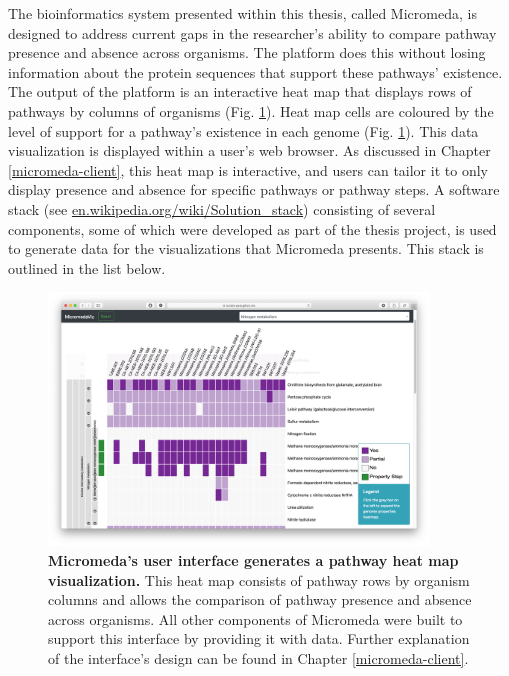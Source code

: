 The bioinformatics system presented within this thesis, called Micromeda, is designed to address current gaps in the researcher's ability to compare pathway presence and absence across organisms. The platform does this without losing information about the protein sequences that support these pathways' existence. The output of the platform is an interactive heat map that displays rows of pathways by columns of organisms (Fig. \ref{fig:basic-heatmap-overview}). Heat map cells are coloured by the level of support for a pathway's existence in each genome (Fig. \ref{fig:basic-heatmap-overview}). This data visualization is displayed within a user's web browser. As discussed in Chapter \ref{micromeda-client}, this heat map is interactive, and users can tailor it to only display presence and absence for specific pathways or pathway steps. A software stack (see \href{http://en.wikipedia.org/wiki/Solution_stack}{en.wikipedia.org/wiki/Solution\_stack}) consisting of several components, some of which were developed as part of the thesis project, is used to generate data for the visualizations that Micromeda presents. This stack is outlined in the list below.

\begin{figure}[!ht]
  \centering
	\includegraphics[width=0.9\textwidth]{media/Micromeda-Simple-Overview.png}
	 \caption[Micromeda's user interface generates a pathway heat map visualization.]{\textbf{Micromeda's user interface generates a pathway heat map visualization.} This heat map consists of pathway rows by organism columns and allows the comparison of pathway presence and absence across organisms. All other components of Micromeda were built to support this interface by providing it with data. Further explanation of the interface's design can be found in Chapter \ref{micromeda-client}.}
	 \label{fig:basic-heatmap-overview}
\end{figure}


